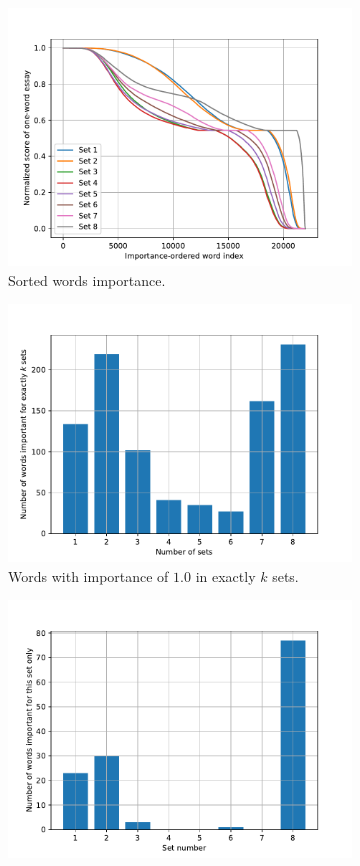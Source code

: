 \documentclass[a4paper,12pt,english]{article}
\begin{document}
\begin{figure}
	\begin{subfigure}{\textwidth}
		\centering
		\includegraphics[width=0.8\linewidth]{fig/words_importance.pdf}
		\caption{Sorted words importance.}
		\label{fig:importance}
	\end{subfigure}
	\newline
	\begin{subfigure}{.5\textwidth}
		\centering
		\includegraphics[width=0.8\linewidth]{fig/words_important_in_k_sets.pdf}
		\caption{Words with importance of $1.0$ in exactly $k$ sets.}
		\label{fig:exactlyk}
	\end{subfigure}
	\begin{subfigure}{.5\textwidth}
		\centering
		\includegraphics[width=0.8\linewidth]{fig/words_important_only_for_k.pdf}

\end{subfigure}
\end{figure}
\end{document}
